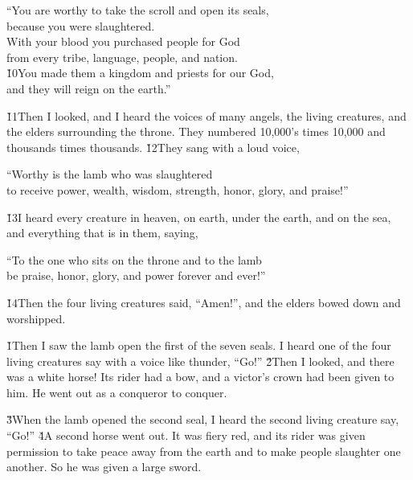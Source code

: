 \begin{poetry}
\poeml ``You are worthy to take the scroll and open its seals, \\
\poemll    because you were slaughtered. \\
\poeml With your blood you purchased people for God \\
\poemll    from every tribe, language, people, and nation. \\
\poeml \v{10}You made them a kingdom and priests for our God, \\
\poemll    and they will reign on the earth.''
\end{poetry}

\v{11}Then I looked, and I heard the voices of many angels, the living creatures, and the elders surrounding the throne. They numbered 10,000's times 10,000 and thousands times thousands. \v{12}They sang with a loud voice,

\begin{poetry}
\poeml ``Worthy is the lamb who was slaughtered \\
\poemll    to receive power, wealth, wisdom, strength, honor, glory, and praise!''
\end{poetry}

\v{13}I heard every creature in heaven, on earth, under the earth, and on the sea, and everything that is in them, saying,

\begin{poetry}
\poeml ``To the one who sits on the throne and to the lamb \\
\poemll    be praise, honor, glory, and power forever and ever!''
\end{poetry}

\v{14}Then the four living creatures said, ``Amen!'', and the elders bowed down and worshipped.

\v{1}Then I saw the lamb open the first of the seven seals. I heard one of the four living creatures say with a voice like thunder, ``Go!'' \v{2}Then I looked, and there was a white horse! Its rider had a bow, and a victor's crown had been given to him. He went out as a conqueror to conquer.

\v{3}When the lamb opened the second seal, I heard the second living creature say, ``Go!'' \v{4}A second horse went out. It was fiery red, and its rider was given permission to take peace away from the earth and to make people slaughter one another. So he was given a large sword.

